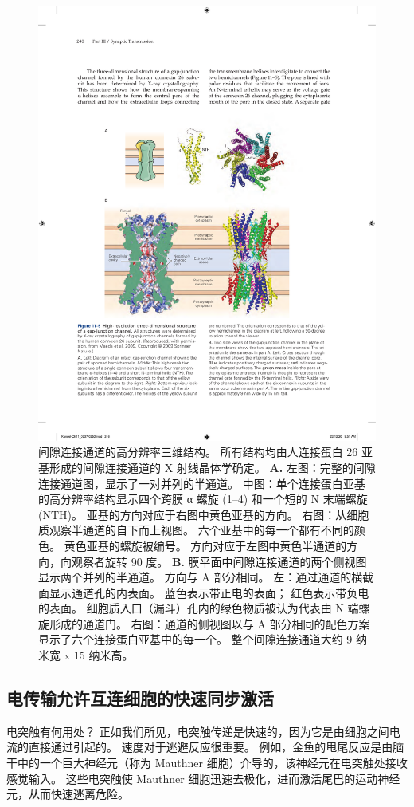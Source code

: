 \begin{figure}[htbp]
	\centering
	\includegraphics[width=0.7\linewidth]{chap11/fig_11_5}
	\caption{间隙连接通道的高分辨率三维结构。
		所有结构均由人连接蛋白 26 亚基形成的间隙连接通道的 X 射线晶体学确定。
		\textbf{A.} 左图：完整的间隙连接通道图，显示了一对并列的半通道。
		中图：单个连接蛋白亚基的高分辨率结构显示四个跨膜 α 螺旋 (1–4) 和一个短的 N 末端螺旋 (NTH)。
		亚基的方向对应于右图中黄色亚基的方向。
		右图：从细胞质观察半通道的自下而上视图。
		六个亚基中的每一个都有不同的颜色。
		黄色亚基的螺旋被编号。
		方向对应于左图中黄色半通道的方向，向观察者旋转 90 度。
		\textbf{B.} 膜平面中间隙连接通道的两个侧视图显示两个并列的半通道。
		方向与 A 部分相同。
		左：通过通道的横截面显示通道孔的内表面。
		蓝色表示带正电的表面；
		红色表示带负电的表面。
		细胞质入口（漏斗）孔内的绿色物质被认为代表由 N 端螺旋形成的通道门。
		右图：通道的侧视图以与 A 部分相同的配色方案显示了六个连接蛋白亚基中的每一个。
		整个间隙连接通道大约 9 纳米宽 x 15 纳米高。}
	\label{fig:11_5}
\end{figure}


\subsection{电传输允许互连细胞的快速同步激活}

电突触有何用处？
正如我们所见，电突触传递是快速的，因为它是由细胞之间电流的直接通过引起的。
速度对于逃避反应很重要。
例如，金鱼的甩尾反应是由脑干中的一个巨大神经元（称为 Mauthner 细胞）介导的，该神经元在电突触处接收感觉输入。
这些电突触使 Mauthner 细胞迅速去极化，进而激活尾巴的运动神经元，从而快速逃离危险。


